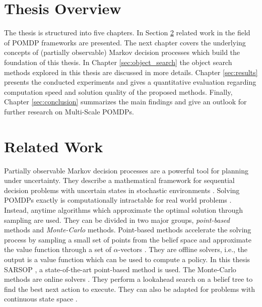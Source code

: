 \section{Thesis Overview}
The thesis is structured into five chapters. In Section \ref{sec:relatedwork} related work in the field of POMDP frameworks are presented. The next chapter covers the underlying concepts of (partially observable) Markov decision processes which build the foundation of this thesis. In Chapter \ref{sec:object_search} the object search methods explored in this thesis are discussed in more details. Chapter \ref{sec:results} presents the conducted experiments and gives a quantitative evaluation regarding computation speed and solution quality of the proposed methods. Finally, Chapter \ref{sec:conclusion} summarizes the main findings and give an outlook for further research on Multi-Scale POMDPs. 


\section{Related Work}\label{sec:relatedwork}
Partially observable Markov decision processes are a powerful tool for planning under uncertainty. They describe a mathematical framework for sequential decision problems with uncertain states in stochastic environments \cite{10.2307/168926}. Solving POMDPs exactly is computationally intractable for real world problems \cite{KAELBLING199899}. Instead, anytime algorithms which approximate the optimal solution through sampling are used. They can be divided in two major groups, \textit{point-based} methods and \textit{Monte-Carlo} methods. Point-based methods accelerate the solving process by sampling a small set of points from the belief space and approximate the value function through a set of $\alpha$-vectors \cite{10.5555/1630659.1630806, Spaan_2005, 6284837}. They are offline solvers, i.e., the output is a value function which can be used to compute a policy. In this thesis SARSOP \cite{6284837}, a state-of-the-art point-based method is used. The Monte-Carlo methods are online solvers \cite{NIPS2010_4031, NIPS2013_5189, Bai2011}. They perform a lookahead search on a belief tree to find the best next action to execute. They can also be adapted for problems with continuous state space \cite{Bai2011}.\\

